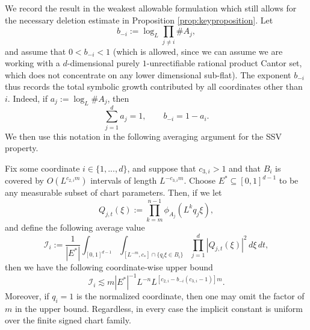 \documentclass[12pt]{amsart}
\numberwithin{equation}{section}
\begin{document}
We record the result in the weakest allowable formulation which still allows for the necessary deletion estimate in Proposition \ref{prop:keyproposition}.
Let
\[
 b_{-i}:=\log_L\prod_{j\neq i}\#A_j,
\]
and assume that $ 0 < b_{-i} < 1 $ (which is allowed, since we can assume we are working with a $d$-dimensional purely $1$-unrectifiable rational product Cantor set, which does not concentrate on any lower dimensional sub-flat). The exponent $b_{-i}$ thus records the total symbolic growth contributed by all coordinates other than $i$. Indeed, if $a_j:=\log_L\#A_j$, then
\[
 \sum_{j=1}^d a_j=1,
 \qquad
 b_{-i}=1-a_i.
\]
We then use this notation in the following averaging argument for the SSV property.

\begin{proposition}\label{prop:coordinateSSVaverage}
Fix some coordinate $i \in \{1,...,d\}$, and suppose that $c_{3,i}>1$ and that $B_i$ is
covered by $O(L^{c_{2,i}m})$ intervals of length $L^{-c_{3,i}m}$.  Choose
$E^* \subseteq [0,1]^{d-1}$ to be any measurable subset of chart parameters.  Then, if we let
\[
 Q_{j,t}(\xi):=\prod_{k=m}^{n-1}\phi_{A_j}(L^kq_j\xi),
\]
and define the following average value 
\[
 \mathcal I_i:=\frac1{|E^*|}
 \int_{[0,1]^{d-1}}
 \int_{[L^{-m},c_*]\cap\{q_i\xi\in B_i\}}
 \prod_{j=1}^d|Q_{j,t}(\xi)|^2\,d\xi\,dt,
\]
then we have the following coordinate-wise upper bound
\begin{equation}\label{eq:correctedSSVaverage}
 \mathcal I_i
 \lesssim
 m|E^*|^{-1}L^{-n}
 L^{[c_{2,i}-b_{-i}(c_{3,i}-1)]m}.
\end{equation}
Moreover, if $q_i = 1$ is the normalized coordinate, then one may omit the factor of $m$ in the upper bound. Regardless, in every case the implicit constant is uniform over the finite
signed chart family.
\end{proposition}
\end{document}
